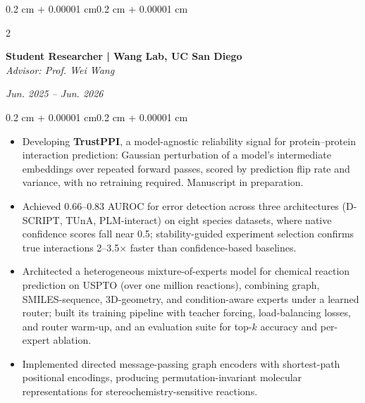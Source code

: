 \documentclass[10pt, letterpaper]{article}
\newenvironment{highlights}{
    \begin{itemize}[
        topsep=0.10 cm,
        parsep=0.10 cm,
        partopsep=0pt,
        itemsep=0pt,
        leftmargin=0.4 cm + 10pt
    ]
}{\end{itemize}}
\newenvironment{onecolentry}{
    \begin{adjustwidth}{0.2 cm + 0.00001 cm}{0.2 cm + 0.00001 cm}
}{\end{adjustwidth}}
\newenvironment{twocolentry}[2][]{
    \onecolentry
    \def\secondColumn{#2}
    \setcolumnwidth{\fill, 4.5 cm}
    \begin{paracol}{2}
}{
    \switchcolumn \raggedleft \secondColumn
    \end{paracol}
    \endonecolentry
}
\begin{document}
    \begin{twocolentry}{\textit{Jun. 2025 -- Jun. 2026}}
        \textbf{Student Researcher | Wang Lab, UC San Diego}\\
        \textit{Advisor: Prof. Wei Wang}
    \end{twocolentry}
    \vspace{0.10 cm}
    \begin{onecolentry}
        \begin{highlights}
            \item Developing \textbf{TrustPPI}, a model-agnostic reliability signal for protein--protein interaction prediction: Gaussian perturbation of a model's intermediate embeddings over repeated forward passes, scored by prediction flip rate and variance, with no retraining required. Manuscript in preparation.
            \item Achieved 0.66--0.83 AUROC for error detection across three architectures (D-SCRIPT, TUnA, PLM-interact) on eight species datasets, where native confidence scores fall near 0.5; stability-guided experiment selection confirms true interactions 2--3.5$\times$ faster than confidence-based baselines.
            \item Architected a heterogeneous mixture-of-experts model for chemical reaction prediction on USPTO (over one million reactions), combining graph, SMILES-sequence, 3D-geometry, and condition-aware experts under a learned router; built its training pipeline with teacher forcing, load-balancing losses, and router warm-up, and an evaluation suite for top-$k$ accuracy and per-expert ablation.
            \item Implemented directed message-passing graph encoders with shortest-path positional encodings, producing permutation-invariant molecular representations for stereochemistry-sensitive reactions.
        \end{highlights}
    \end{onecolentry}
    \vspace{0.20 cm}
\end{document}
